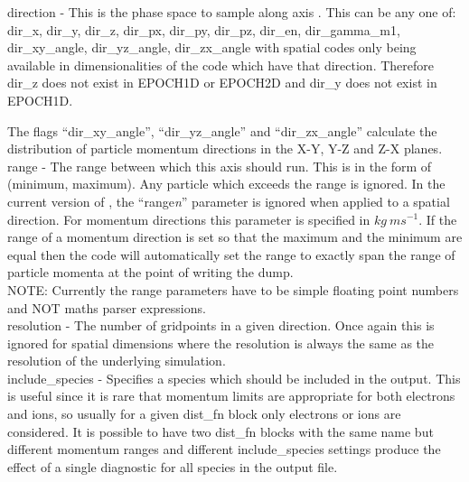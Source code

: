 {\emphtext direction} - This is the phase space to sample
along axis . This can be any one of:
dir\_x, dir\_y, dir\_z, dir\_px, dir\_py, dir\_pz, dir\_en, dir\_gamma\_m1,
dir\_xy\_angle, dir\_yz\_angle, dir\_zx\_angle
with spatial codes only being available in dimensionalities of the code which
have that direction. Therefore dir\_z does not exist in EPOCH1D or EPOCH2D
and dir\_y does not exist in EPOCH1D.

The flags ``dir\_xy\_angle'', ``dir\_yz\_angle'' and
``dir\_zx\_angle'' calculate the distribution
of particle momentum directions in the X-Y, Y-Z and Z-X planes.\\

{\emphtext range} - The range between which this axis should
run. This is in the form of (minimum, maximum). Any particle which exceeds
the range is ignored. In the current version of {\EPOCH}, the ``range{\it n}''
parameter is ignored when applied to a spatial direction.
For momentum directions this parameter is specified in
$kg\ ms^{-1}$. If the range of a momentum direction is set so that the maximum
and the minimum are equal then the code will automatically set the range to
exactly span the range of particle momenta at the point of writing the dump.\\

{\emphtext NOTE: Currently the range parameters have to be simple floating
point numbers and NOT maths parser expressions.}\\

{\emphtext resolution} - The number of gridpoints in a given
direction. Once again this is ignored for spatial dimensions where the
resolution is always the same as the resolution of the underlying simulation.\\

{\emphtext include\_species} - Specifies a species which should be included
in the output. This is useful since it is rare that momentum limits are
appropriate for both electrons and ions, so usually for a given dist\_fn block
only electrons or ions are considered. It is possible to have two dist\_fn
blocks with the same name but different momentum ranges and different
include\_species settings produce the effect of a single diagnostic for
all species in the output file.\\

